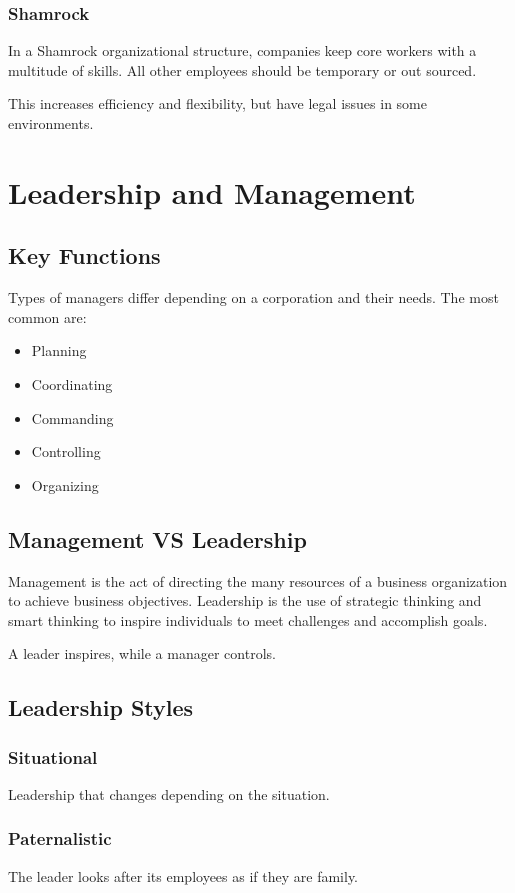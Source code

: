 \documentclass{standalone}
\begin{document}
\subsubsection{Shamrock}
In a Shamrock organizational structure, companies keep core workers with a multitude of skills.
All other employees should be temporary or out sourced.

This increases efficiency and flexibility, but have legal issues in some environments.

\section{Leadership and Management} 
\subsection{Key Functions}
Types of managers differ depending on a corporation and their needs.
The most common are:
\begin{itemize}
	\item Planning
	\item Coordinating
	\item Commanding
	\item Controlling
	\item Organizing
\end{itemize}

\subsection{Management VS Leadership}
Management is the act of directing the many resources of a business organization to achieve business objectives.
Leadership is the use of strategic thinking and smart thinking to inspire individuals to meet challenges and accomplish goals.

A leader inspires, while a manager controls.

\subsection{Leadership Styles}
\subsubsection{Situational}
Leadership that changes depending on the situation.

\subsubsection{Paternalistic}
The leader looks after its employees as if they are family.
\end{document}
